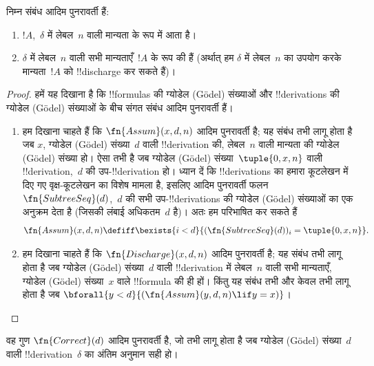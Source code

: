 \documentclass[../../../include/open-logic-section]{subfiles}
\begin{document}
\begin{prop}
  निम्न संबंध आदिम पुनरावर्ती हैं:
  \begin{enumerate}
  \item $!A$,~$\delta$ में लेबल~$n$ वाली मान्यता के रूप में आता है।
  \item $\delta$ में लेबल~$n$ वाली सभी मान्यताएँ~$!A$ के रूप की हैं
    (अर्थात् हम $\delta$ में लेबल~$n$ का उपयोग करके मान्यता~$!A$ को
    !!{discharge} कर सकते हैं)।
  \end{enumerate}
\end{prop}

\begin{proof}
  हमें यह दिखाना है कि !!{formula}s की ग्योडेल (G\"odel) संख्याओं और
  !!{derivation}s की ग्योडेल (G\"odel) संख्याओं के बीच संगत संबंध आदिम
  पुनरावर्ती हैं।
  \begin{enumerate}
  \item हम दिखाना चाहते हैं कि $\fn{Assum}(x, d, n)$ आदिम पुनरावर्ती है;
    यह संबंध तभी लागू होता है जब $x$, ग्योडेल (G\"odel) संख्या~$d$ वाली
    !!{derivation} की, लेबल~$n$ वाली मान्यता की ग्योडेल (G\"odel) संख्या
    हो। ऐसा तभी है जब ग्योडेल (G\"odel) संख्या~$\tuple{0, x, n}$ वाली
    !!{derivation},~$d$ की उप-!!{derivation} हो। ध्यान दें कि !!{derivation}s
    का हमारा कूटलेखन
     में दिए गए वृक्ष-कूटलेखन का विशेष मामला है,
    इसलिए आदिम पुनरावर्ती फलन $\fn{SubtreeSeq}(d)$,~$d$ की सभी
    उप-!!{derivation}s की ग्योडेल (G\"odel) संख्याओं का एक अनुक्रम देता है
    (जिसकी लंबाई अधिकतम~$d$ है)। अतः हम परिभाषित कर सकते हैं
    \[
    \fn{Assum}(x, d, n) \defiff \bexists{i<d}{(\fn{SubtreeSeq}(d))_i =
      \tuple{0, x, n}}.
    \]
  \item हम दिखाना चाहते हैं कि $\fn{Discharge}(x, d, n)$ आदिम पुनरावर्ती
    है; यह संबंध तभी लागू होता है जब ग्योडेल (G\"odel) संख्या~$d$ वाली
    !!{derivation} में लेबल~$n$ वाली सभी मान्यताएँ, ग्योडेल (G\"odel)
    संख्या~$x$ वाले !!{formula} की ही हों। किंतु यह संबंध तभी और केवल तभी
    लागू होता है जब $\bforall{y<d}{(\fn{Assum}(y, d, n) \lif y = x)}$।
  \end{enumerate}
\end{proof}

\begin{prop}
  वह गुण $\fn{Correct}(d)$ आदिम पुनरावर्ती है, जो तभी लागू होता है जब
  ग्योडेल (G\"odel) संख्या~$d$ वाली !!{derivation}~$\delta$ का अंतिम
  अनुमान सही हो।
\end{prop}
\end{document}
